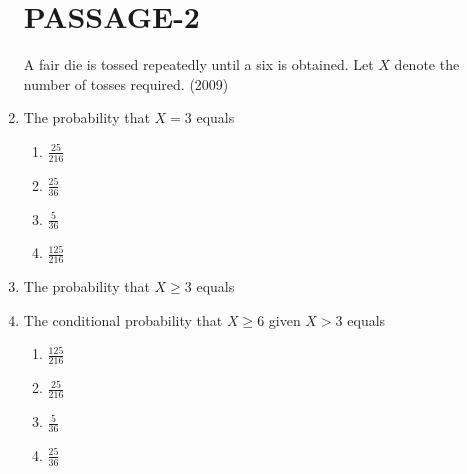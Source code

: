 \documentclass[journal,12pt,onecolumn,article]{IEEEtran}
\theoremstyle{remark}
\begin{document}
\begin{enumerate}
		\section*{PASSAGE-2}
		A fair die is tossed repeatedly until a six is obtained. Let $X$ denote the number of tosses required. \hfill(2009)
         \item The probability that $X=3$ equals
		 \begin{enumerate}
				 \item $\frac{25}{216}$
				 \item $\frac{25}{36}$
				 \item $\frac{5}{36}$
				 \item $\frac{125}{216}$
		 \end{enumerate}
	 \item The probability that $X\ge3$ equals 
		 \begin{enumerate}
		 \end{enumerate}
	 \item The conditional probability that $X\ge6$ given $X>3$ equals
		 \begin{enumerate}
				 \item $\frac{125}{216}$
				 \item $\frac{25}{216}$
				 \item $\frac{5}{36}$
				 \item $\frac{25}{36}$
		 \end{enumerate}

\end{enumerate}
\end{document}

